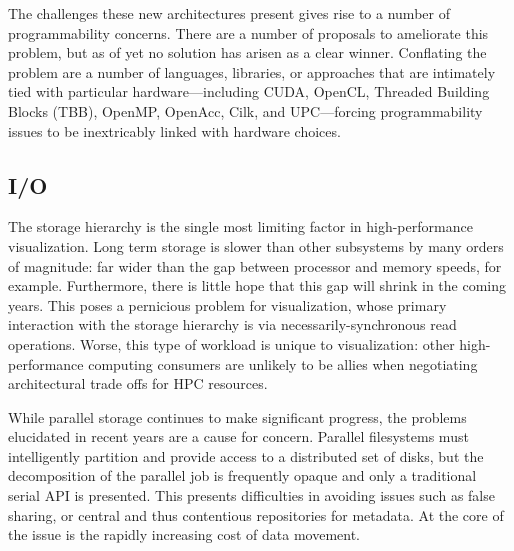 
The challenges these new architectures present gives rise to a number
of programmability concerns.  There are a number of proposals to
ameliorate this problem, but as of yet no solution has arisen as a
clear winner.  Conflating the problem are a number of languages,
libraries, or approaches that are intimately tied with particular
hardware---including CUDA, OpenCL, Threaded Building Blocks (TBB),
OpenMP, OpenAcc, Cilk, and UPC---forcing programmability issues to be
inextricably linked with hardware choices.



\subsection{I/O}

The storage hierarchy is the single most limiting factor in
high-performance visualization.  Long term storage is slower than other
subsystems by many orders of magnitude: far wider than the gap between
processor and memory speeds, for example.  Furthermore, there is little
hope that this gap will shrink in the coming years.  This poses a
pernicious problem for visualization, whose primary interaction with
the storage hierarchy is via necessarily-synchronous read operations.
Worse, this type of workload is unique to visualization: other
high-performance computing consumers are unlikely to be allies when
negotiating architectural trade offs for HPC resources.


While parallel storage continues to make significant progress, the
problems elucidated in recent years are a cause for concern.  Parallel
filesystems must intelligently partition and provide access to a
distributed set of disks, but the decomposition of the parallel job
is frequently opaque and only a traditional serial API is presented.
This presents difficulties in avoiding issues such as false sharing, or
central and thus contentious repositories for metadata.  At the core of
the issue is the rapidly increasing cost of data movement.

